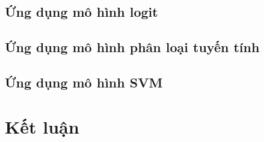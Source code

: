 \documentclass[a4paper]{report}\usepackage[]{graphicx}\usepackage[]{color}
\begin{document}
\section{Ứng dụng mô hình logit}

\section{Ứng dụng mô hình phân loại tuyến tính}

\section{Ứng dụng mô hình SVM}


\chapter{Kết luận}


\end{document}
